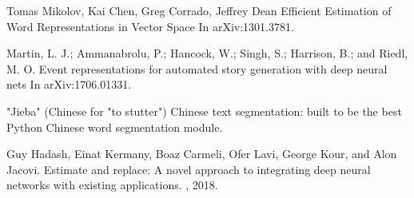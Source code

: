 \documentclass{article}
\begin{document}
  


\begin{thebibliography}{1}

Tomas Mikolov, Kai Chen, Greg Corrado, Jeffrey Dean
\newblock Efficient Estimation of Word Representations in Vector Space
\newblock In arXiv:1301.3781.

Martin, L. J.; Ammanabrolu, P.; Hancock, W.; Singh, S.; Harrison, B.; and Riedl, M. O. 
\newblock Event representations for automated story generation with deep neural nets
\newblock In arXiv:1706.01331.

\newblock "Jieba" (Chinese for "to stutter") Chinese text segmentation: built to be the best Python Chinese word segmentation module.


Guy Hadash, Einat Kermany, Boaz Carmeli, Ofer Lavi, George Kour, and Alon
  Jacovi.
\newblock Estimate and replace: A novel approach to integrating deep neural
  networks with existing applications.
, 2018.

\end{thebibliography}
\end{document}
